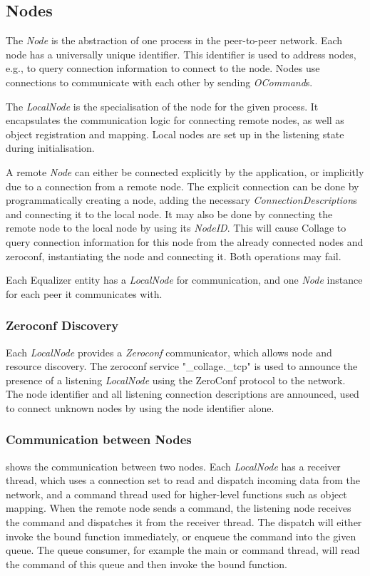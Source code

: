 \subsection{Nodes}

The {\em Node} is the abstraction of one process in the peer-to-peer network.
Each node has a universally unique identifier. This identifier is used to
address nodes, e.g., to query connection information to connect to the node.
Nodes use connections to communicate with each other by sending
{\em OCommand}s.

The {\em LocalNode} is the specialisation of the node for the given process.
It encapsulates the communication logic for connecting remote nodes, as well as
object registration and mapping. Local nodes are set up in the listening state
during initialisation.

A remote {\em Node} can either be connected explicitly by the application,
or implicitly due to a connection from a remote node. The explicit connection
can be done by programmatically creating a node, adding the necessary
{\em ConnectionDescription}s and connecting it to the local node. It may
also be done by connecting the remote node to the local node by using its
{\em NodeID}. This will cause Collage to query connection information for
this node from the already connected nodes and zeroconf, instantiating the node
and connecting it. Both operations may fail.

Each Equalizer entity has a {\em LocalNode} for communication, and one {\em
Node} instance for each peer it communicates with.

\subsubsection{\label{sZeroconf}Zeroconf Discovery}

Each {\em LocalNode} provides a {\em Zeroconf} communicator, which allows
node and resource discovery. The zeroconf service "\_collage.\_tcp" is used to
announce the presence of a listening {\em LocalNode} using the ZeroConf
protocol to the network. The node identifier and all listening connection
descriptions are announced, used to connect unknown nodes by using the
node identifier alone.

\subsubsection{Communication between Nodes}

 shows the communication between two nodes. Each
{\em LocalNode} has a receiver thread, which uses a connection set to read
and dispatch incoming data from the network, and a command thread used for
higher-level functions such as object mapping. When the remote node sends a
command, the listening node receives the command and dispatches it from the
receiver thread. The dispatch will either invoke the bound function immediately,
or enqueue the command into the given queue. The queue consumer, for example the
main or command thread, will read the command of this queue and then invoke the
bound function.

